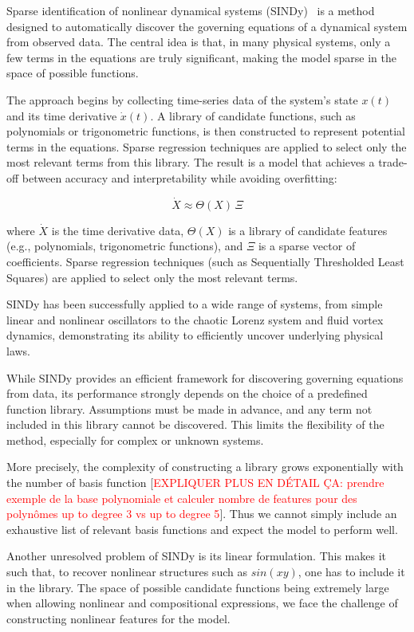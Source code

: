 \documentclass[11pt, a4paper]{article}
\begin{document}
Sparse identification of nonlinear dynamical systems (SINDy)~\cite{brunton2016sindy} is a method designed to automatically discover the governing equations of a dynamical system from observed data. The central idea is that, in many physical systems, only a few terms in the equations are truly significant, making the model sparse in the space of possible functions.

The approach begins by collecting time-series data of the system's state $x(t)$ and its time derivative $\dot{x}(t)$. A library of candidate functions, such as polynomials or trigonometric functions, is then constructed to represent potential terms in the equations. Sparse regression techniques are applied to select only the most relevant terms from this library. The result is a model that achieves a trade-off between accuracy and interpretability while avoiding overfitting:


$$ \dot{X} \approx \Theta(X) \, \Xi $$

where $\dot{X}$ is the time derivative data, $\Theta(X)$ is a library of candidate features (e.g., polynomials, trigonometric functions), and $\Xi$ is a sparse vector of coefficients. Sparse regression techniques (such as Sequentially Thresholded Least Squares) are applied to select only the most relevant terms.

SINDy has been successfully applied to a wide range of systems, from simple linear and nonlinear oscillators to the chaotic Lorenz system and fluid vortex dynamics, demonstrating its ability to efficiently uncover underlying physical laws. 

While SINDy provides an efficient framework for discovering governing equations from data, its performance strongly depends on the choice of a predefined function library. Assumptions must be made in advance, and any term not included in this library cannot be discovered. This limits the flexibility of the method, especially for complex or unknown systems. 

More precisely, the complexity of constructing a library grows exponentially with the number of basis function [\textcolor{red}{EXPLIQUER PLUS EN DÉTAIL ÇA: prendre exemple de la base polynomiale et calculer nombre de features pour des polynômes up to degree 3 vs up to degree 5}]. Thus we cannot simply include an exhaustive list of relevant basis functions and expect the model to perform well. 

Another unresolved problem of SINDy is its linear formulation. This makes it such that, to recover nonlinear structures such as $sin(xy)$, one has to include it in the library. The space of possible candidate functions being extremely large when allowing nonlinear and compositional expressions, we face the challenge of constructing nonlinear features for the model. 
\end{document}
